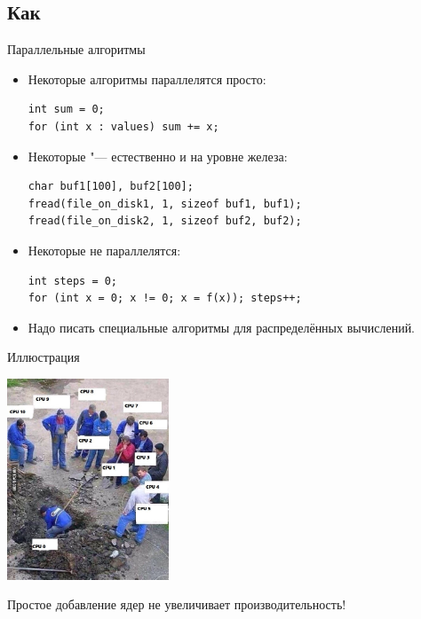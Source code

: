 \subsection{Как}
\begin{frame}[fragile]{Параллельные алгоритмы}
	\begin{itemize}
		\item Некоторые алгоритмы параллелятся просто:
\begin{verbatim}
int sum = 0;
for (int x : values) sum += x;
\end{verbatim}
		\item Некоторые "--- естественно и на уровне железа:
\begin{verbatim}
char buf1[100], buf2[100];
fread(file_on_disk1, 1, sizeof buf1, buf1);
fread(file_on_disk2, 1, sizeof buf2, buf2);
\end{verbatim}
		\item Некоторые не параллелятся:
\begin{verbatim}
int steps = 0;
for (int x = 0; x != 0; x = f(x)); steps++;
\end{verbatim}
		\item Надо писать специальные алгоритмы для распределённых вычислений.
	\end{itemize}
\end{frame}

\begin{frame}{Иллюстрация}
	\begin{center}
		\includegraphics[height=6cm]{cpus-joke.jpg}

		Простое добавление ядер не увеличивает производительность!
	\end{center}
\end{frame}

